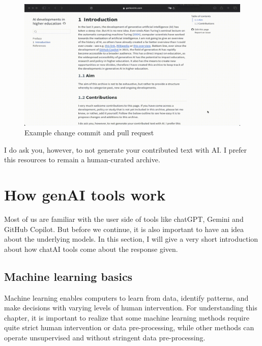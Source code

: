 \documentclass[
  letterpaper,
  DIV=11,
  numbers=noendperiod]{scrreprt}
\begin{document}
\begin{figure}[H]

{\centering \includegraphics{img/contribute.gif}

}

\caption{Example change commit and pull request}

\end{figure}%

I do ask you, however, to not generate your contributed text with AI. I
prefer this resources to remain a human-curated archive.


\chapter{How genAI tools work}\label{how-genai-tools-work}

Most of us are familiar with the user side of tools like chatGPT, Gemini
and GitHub Copilot. But before we continue, it is also important to have
an idea about the underlying models. In this section, I will give a very
short introduction about how chatAI tools come about the response given.

\section{Machine learning basics}\label{machine-learning-basics}

Machine learning enables computers to learn from data, identify
patterns, and make decisions with varying levels of human intervention.
For understanding this chapter, it is important to realize that some
machine learning methods require quite strict human intervention or data
pre-processing, while other methods can operate unsupervised and without
stringent data pre-processing.
\end{document}
